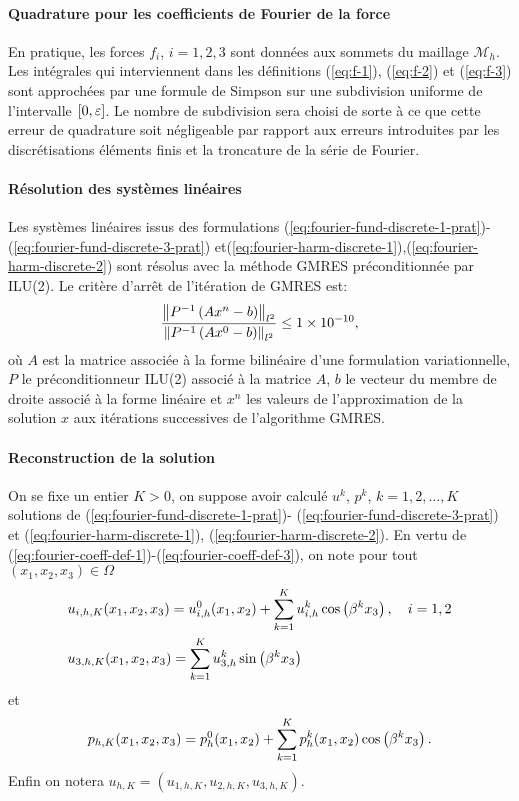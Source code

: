 \paragraph{Quadrature pour les coefficients de Fourier de la force}
En pratique, les forces $f_i$, $i = 1,2,3$ sont données aux sommets du
maillage $\mathcal M_h$. Les intégrales qui interviennent dans les
définitions (\ref{eq:f-1}), (\ref{eq:f-2}) et (\ref{eq:f-3}) sont
approchées par une formule de Simpson sur une subdivision uniforme de
l'intervalle $[0, \varepsilon]$. Le nombre de subdivision sera choisi
de sorte à ce que cette erreur de quadrature soit négligeable par
rapport aux erreurs introduites par les discrétisations éléments
finis et la troncature de la série de Fourier.

\paragraph{Résolution des systèmes linéaires}
Les systèmes linéaires issus des formulations
(\ref{eq:fourier-fund-discrete-1-prat})-(\ref{eq:fourier-fund-discrete-3-prat})
et(\ref{eq:fourier-harm-discrete-1}),(\ref{eq:fourier-harm-discrete-2})
sont résolus avec la méthode GMRES préconditionnée par ILU(2). Le
critère d'arrêt de l'itération de GMRES est:
\begin{equation}
  \frac{\left\lVert P^{-1}\left( Ax^n - b \right) \right\rVert_{l^2}}{\left\lVert P^{-1}\left( Ax^0 - b \right) \right\rVert_{l^2}} \leq \num{1e-10},
\end{equation}
où $A$ est la matrice associée à la forme bilinéaire d'une formulation
variationnelle, $P$ le préconditionneur ILU(2) associé à la matrice
$A$, $b$ le vecteur du membre de droite associé à la forme linéaire et
$x^n$ les valeurs de l'approximation de la solution $x$ aux itérations
successives de l'algorithme GMRES.

\paragraph{Reconstruction de la solution}
On se fixe un entier $K > 0$, on suppose avoir calculé $u^k$, $p^k$, $k
= 1, 2,\dots, K$ solutions de (\ref{eq:fourier-fund-discrete-1-prat})-%
(\ref{eq:fourier-fund-discrete-3-prat}) et
(\ref{eq:fourier-harm-discrete-1}),
(\ref{eq:fourier-harm-discrete-2}). En vertu de
(\ref{eq:fourier-coeff-def-1})-(\ref{eq:fourier-coeff-def-3}), on note
pour tout $(x_1, x_2, x_3)\in \Omega$
\begin{align}
  &u_{i,h,K}(x_1, x_2, x_3) = u_{i,h}^0(x_1, x_2) + \sum_{k = 1}^K
  u_{i,h}^k \cos\left( \beta^k x_3 \right),\quad i = 1,2\label{eq:u-h-12}\\
  &u_{3,h,K}(x_1, x_2, x_3) = \sum_{k = 1}^K
  u_{3,h}^k \sin\left( \beta^k x_3 \right)\label{eq:u-h-3}
\end{align}
et
\begin{align}
  p_{h,K}(x_1, x_2, x_3) = p_h^0(x_1, x_2) + \sum_{k = 1}^K p_h^k(x_1,
  x_2) \cos\left( \beta^k x_3 \right).
\end{align}
Enfin on notera $u_{h,K} = (u_{1,h,K}, u_{2,h,K}, u_{3,h,K})$.
